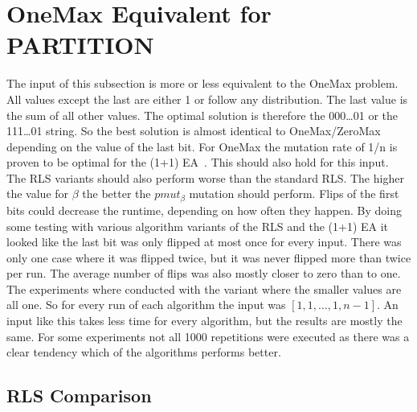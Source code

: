 \section{OneMax Equivalent for PARTITION}
The input of this subsection is more or less equivalent to the OneMax problem. All values except the last are either 1 or follow any distribution. The last value is the sum of all other values. The optimal solution is therefore the 000\dots01 or
the 111\dots01 string. So the best solution is almost identical to OneMax/ZeroMax depending on the value of the last bit.\newline
For OneMax the mutation rate of 1/n is proven to be optimal for the (1+1) EA~\cite{witt2013tight}.
This should also hold for this input.
The RLS variants should also perform worse than the standard RLS.
The higher the value for $\beta$ the better the $pmut_\beta$ mutation should perform.
Flips of the first bits could decrease the runtime, depending on how often they happen.
By doing some testing with various algorithm variants of the RLS and the (1+1) EA it looked like the last bit was only flipped at most once for every input.
There was only one case where it was flipped twice, but it was never flipped more than twice per run.
The average number of flips was also mostly closer to zero than to one.\newline
The experiments where conducted with the variant where the smaller values are all one.
So for every run of each algorithm the input was $[1, 1, \dots, 1, n-1]$.
An input like this takes less time for every algorithm, but the results are mostly the same.
For some experiments not all 1000 repetitions were executed as there was a clear tendency which of the algorithms performs better.
\subsection{RLS Comparison}




